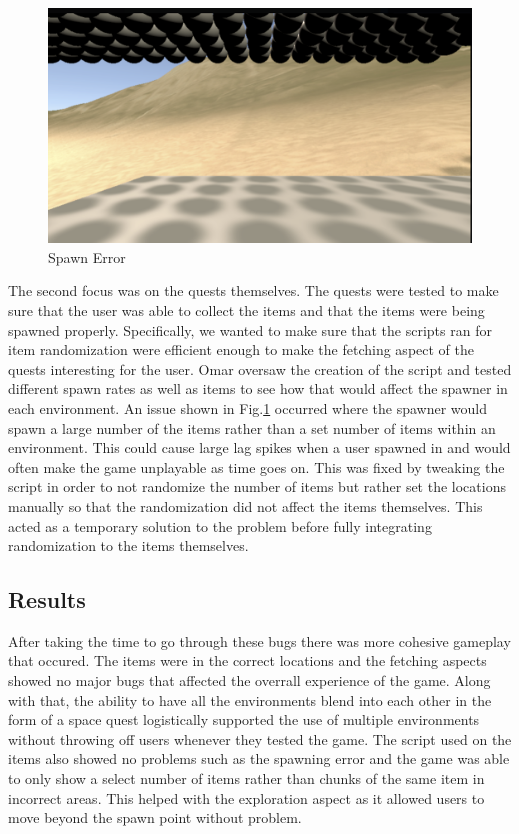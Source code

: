 \documentclass{vgtc}                          %
\begin{document}
\begin{figure}[ht!]
  \centering
  \includegraphics[width= 0.8\linewidth]{Figures/SpawnerBug.png}
  \caption{Spawn Error}
  \label{fig:spawnbug}
\end{figure}

The second focus was on the quests themselves. The quests were tested to make sure that the user was able to collect the items and that the items were being spawned properly. Specifically, we wanted to make sure that the scripts ran for item randomization were efficient enough to make the fetching aspect of the quests interesting for the user. Omar oversaw the creation of the script and tested
different spawn rates as well as items to see how that would affect the spawner in each environment. An issue shown in Fig.\ref{fig:spawnbug} occurred where the spawner would spawn a large number of the items rather than a set number of items within an environment. This could cause large lag spikes when a user spawned in and would often make the game unplayable as time goes on. This was fixed by tweaking
the script in order to not randomize the number of items but rather set the locations manually so that the randomization did not affect the items themselves. This acted as a temporary solution to the problem before fully integrating randomization to the items themselves.

\subsection*{Results}

After taking the time to go through these bugs there was more cohesive gameplay that occured. The items were in the correct locations and the fetching aspects showed no major bugs that affected the overrall experience of the game. Along with that, the ability to have all the environments blend into each other in the form of a space quest logistically supported the use of multiple environments without
throwing off users whenever they tested the game. The script used on the items also showed no problems such as the spawning error and the game was able to only show a select number of items rather than chunks of the same item in incorrect areas. This helped with the exploration aspect as it allowed users to move beyond the spawn point without problem.
\end{document}
